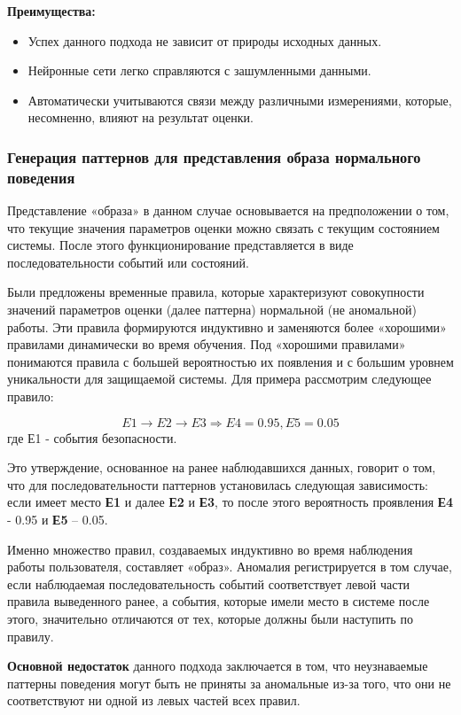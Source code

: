 \textbf{Преимущества:}
\begin{itemize}
    \item Успех данного подхода не зависит от природы исходных данных.
    \item Нейронные сети легко справляются с зашумленными данными.
    \item Автоматически учитываются связи между различными измерениями, которые,
    несомненно, влияют на результат оценки.
\end{itemize}
\autocite{BeynonDavies}


\subsubsection{Генерация паттернов для представления образа нормального поведения}
Представление «образа» в данном случае основывается на предположении о том, что текущие значения
параметров оценки можно связать с текущим состоянием системы. После этого функционирование
представляется в виде последовательности событий или состояний.

Были предложены временные правила, которые характеризуют совокупности значений параметров оценки
(далее паттерна) нормальной (не аномальной) работы. Эти правила формируются индуктивно и заменяются
более «хорошими» правилами динамически во время обучения. Под «хорошими правилами» понимаются правила
с большей вероятностью их появления и с большим уровнем уникальности для защищаемой системы.
Для примера рассмотрим следующее правило:

\begin{equation}
	E1 \rightarrow E2\rightarrow E3 \Rightarrow E4 = 0.95, E5 = 0.05
\end{equation}
где Е1 - события безопасности.

Это утверждение, основанное на ранее наблюдавшихся данных, говорит о том, что для последовательности
паттернов установилась следующая зависимость: если имеет место \textbf{Е1} и далее \textbf{Е2} и \textbf{Е3},
то после этого вероятность проявления \textbf{Е4} - 0.95 и \textbf{Е5} – 0.05.

Именно множество правил, создаваемых индуктивно во время наблюдения работы пользователя, составляет «образ».
Аномалия регистрируется в том случае, если наблюдаемая последовательность событий соответствует левой
части правила выведенного ранее, а события, которые имели место в системе после этого,
значительно отличаются от тех, которые должны были наступить по правилу.

\textbf{Основной недостаток} данного подхода заключается в том, что неузнаваемые паттерны поведения могут
быть не приняты за аномальные из-за того, что они не соответствуют ни одной из левых частей
всех правил.\autocite{IDSystem}

